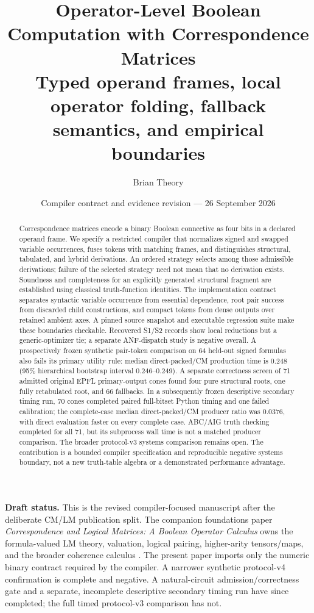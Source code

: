 \documentclass[10pt]{article}
\title{\vspace{-1.3em}\textbf{Operator-Level Boolean Computation with Correspondence Matrices}\\[0.35em]
\large Typed operand frames, local operator folding, fallback semantics, and empirical boundaries}
\author{Brian Theory}
\date{Compiler contract and evidence revision --- 26 September 2026}
\theoremstyle{plain}
\theoremstyle{definition}
\theoremstyle{remark}
\begin{document}
\maketitle

\begin{abstract}
Correspondence matrices encode a binary Boolean connective as four bits in a declared operand frame. We specify a restricted compiler that normalizes signed and swapped variable occurrences, fuses tokens with matching frames, and distinguishes structural, tabulated, and hybrid derivations. An ordered strategy selects among those admissible derivations; failure of the selected strategy need not mean that no derivation exists. Soundness and completeness for an explicitly generated structural fragment are established using classical truth-function identities. The implementation contract separates syntactic variable occurrence from essential dependence, root pair success from discarded child constructions, and compact tokens from dense outputs over retained ambient axes. A pinned source snapshot and executable regression suite make these boundaries checkable. Recovered S1/S2 records show local reductions but a generic-optimizer tie; a separate ANF-dispatch study is negative overall. A prospectively frozen synthetic pair-token comparison on 64 held-out signed formulas also fails its primary utility rule: median direct-packed/CM production time is 0.248 (95\% hierarchical bootstrap interval 0.246--0.249). A separate correctness screen of 71 admitted original EPFL primary-output cones found four pure structural roots, one fully retabulated root, and 66 fallbacks. In a subsequently frozen descriptive secondary timing run, 70 cones completed paired full-bitset Python timing and one failed calibration; the complete-case median direct-packed/CM producer ratio was 0.0376, with direct evaluation faster on every complete case. ABC/AIG truth checking completed for all 71, but its subprocess wall time is not a matched producer comparison. The broader protocol-v3 systems comparison remains open. The contribution is a bounded compiler specification and reproducible negative systems boundary, not a new truth-table algebra or a demonstrated performance advantage.

\end{abstract}

\noindent\textbf{Draft status.} This is the revised compiler-focused manuscript after the deliberate CM/LM publication split. The companion foundations paper \emph{Correspondence and Logical Matrices: A Boolean Operator Calculus} owns the formula-valued LM theory, valuation, logical pairing, higher-arity tensors/maps, and the broader coherence calculus \cite{TheoryFoundations2026}. The present paper imports only the numeric binary contract required by the compiler. A narrower synthetic protocol-v4 confirmation is complete and negative. A natural-circuit admission/correctness gate and a separate, incomplete descriptive secondary timing run have since completed; the full timed protocol-v3 comparison has not.
\end{document}
